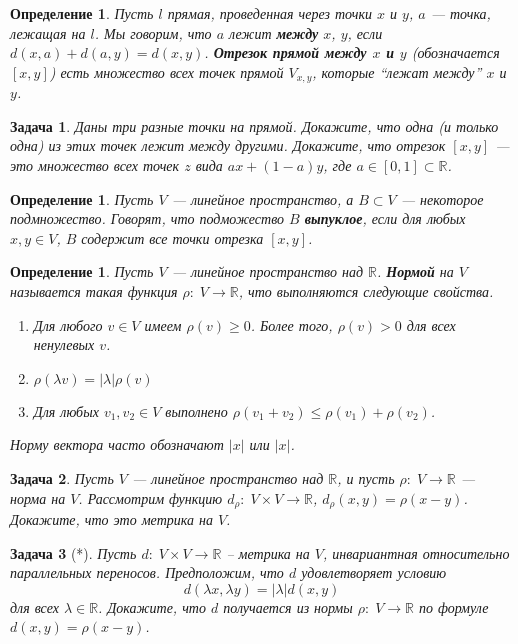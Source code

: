 \documentclass[12pt]{book}
\def\R{{\mathbb R}}
\theoremstyle{upshape}
\newtheorem{zadacha}{Задача}[chapter]
\theoremstyle{generic}
\newtheorem{opredelenie}[teorema]{Определение}
\theoremstyle{upshapenonumber}
\newcommand{\следствие}{%
     \refstepcounter{teorema}
     {\noindent\bf Следствие \thechapter.\arabic{teorema}:\ }}
\newcommand{\пример}{%
     \refstepcounter{teorema}
     {\noindent\bf Пример \thechapter.\arabic{teorema}:\ }}
\newcommand{\лемма}{%
     \refstepcounter{teorema}
     {\noindent\bf Лемма \thechapter.\arabic{teorema}:\ }}
\newcommand{\теорема}{%
     \refstepcounter{teorema}
     {\noindent\bf Теорема \thechapter.\arabic{teorema}:\ }}
\newcommand{\утверждение}{%
     \refstepcounter{teorema}
     {\noindent\bf Утверждение \thechapter.\arabic{teorema}:\ }}
\begin{document}
{\begin{opredelenie} Пусть $l$ прямая, проведенная через
точки $x$ и $y$, $a$ --- точка, лежащая на
$l$. Мы говорим, что $a$ лежит {\bf между} $x$, $y$,
если $d(x,a)+ d(a,y)= d(x,y)$.
{\bf Отрезок прямой между $x$ и $y$}
(обозначается $[x,y]$) есть множество всех точек прямой $V_{x,y}$,
которые ``лежат между'' $x$ и $y$. 
\end{opredelenie}

\begin{zadacha} Даны три разные точки на прямой. Докажите,
что одна (и только одна) из этих точек лежит между другими.
Докажите, что отрезок $[x,y]$ --- это множество всех
точек $z$ вида $a x + (1-a) y$, где $a \in [0, 1] \subset \R$.
\end{zadacha}

\begin{opredelenie} Пусть $V$ --- линейное пространство,
а $B\subset V$ --- некоторое подмножество. Говорят, что подможество
$B$ {\bf выпуклое}, если для любых $x, y \in V$, $B$ содержит все
точки отрезка $[x,y]$.
\end{opredelenie}

\begin{opredelenie} Пусть $V$ --- линейное пространство
над $\R$. {\bf Нормой} на $V$ называется такая функция $\rho:\; V
\to \R$, что выполняются следующие свойства.
\begin{enumerate}
\item Для любого $v\in V$ имеем $\rho(v) \geq 0$. Более того,
$\rho(v)>0$ для всех ненулевых $v$.

\item $\rho(\lambda v) = |\lambda| \rho(v)$

\item Для любых $v_1, v_2\in V$ выполнено $\rho(v_1+ v_2) \leq
\rho(v_1)+ \rho(v_2)$.
\end{enumerate}
Норму вектора часто обозначают $\vert x \vert$ или $|x|$. 
\end{opredelenie}


\begin{zadacha} Пусть $V$ --- линейное пространство
над $\R$, и пусть $\rho:\; V \to \R$ --- норма на $V$.  Рассмотрим
функцию $d_\rho:\; V \times V \to \R$, $d_\rho (x, y) =
\rho(x-y)$. Докажите, что это метрика на $V$.
\end{zadacha}

\begin{zadacha}[*] Пусть $d:\; V \times V \to \R$ --
метрика на $V$, инвариантная относительно параллельных
переносов. Предположим, что $d$ удовлетворяет условию
$$
d(\lambda x, \lambda y)= |\lambda| d(x,y)
$$
для всех $\lambda \in \R$. Докажите, что $d$ получается из нормы
$\rho:\; V \to \R$ по формуле $d (x, y) = \rho(x-y)$.
\end{zadacha}

}
\end{document}
